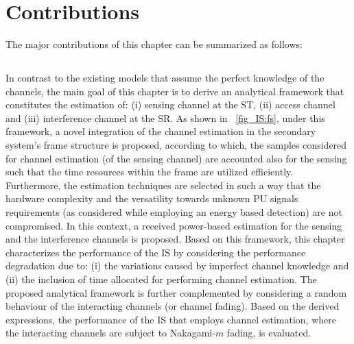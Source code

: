 \section{Contributions}
The major contributions of this chapter can be summarized as follows:
\subsection{}
In contrast to the existing models that assume the perfect knowledge of the channels, the main goal of this chapter is to derive an analytical framework that constitutes the estimation of: (i) sensing channel at the ST, (ii) access channel and (iii) interference channel at the SR. As shown in \figurename~\ref{fig_IS:fs}, under this framework, a novel integration of the channel estimation in the secondary system's frame structure is proposed, according to which, the samples considered for channel estimation (of the sensing channel) are accounted also for the sensing such that the time resources within the frame are utilized efficiently. Furthermore, the estimation techniques are selected in such a way that the hardware complexity and the versatility towards unknown PU signals requirements (as considered while employing an energy based detection) are not compromised. In this context, a received power-based estimation for the sensing and the interference channels is proposed. Based on this framework, this chapter characterizes the performance of the IS by considering the performance degradation due to: (i) the variations caused by imperfect channel knowledge and (ii) the inclusion of time allocated for performing channel estimation. The proposed analytical framework is further complemented by considering a random behaviour of the interacting channels (or channel fading). Based on the derived expressions, the performance of the IS that employs channel estimation, where the interacting channels are subject to Nakagami-$m$ fading, is evaluated.



